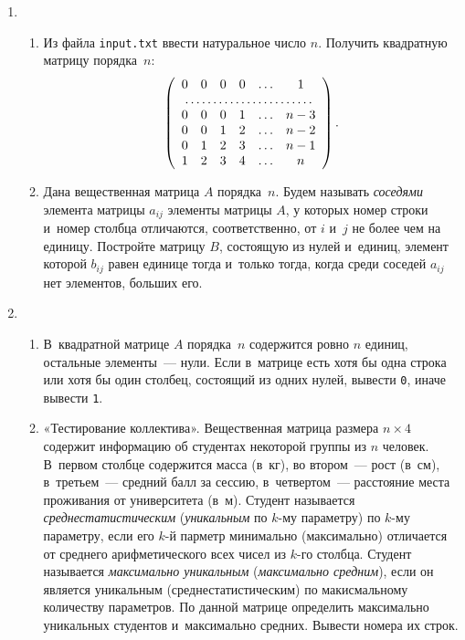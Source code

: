 \documentclass{article}
\newcommand{\textex}[1]{\texttt{\color{ForestGreen}#1}}
\begin{document}
\begin{enumerate}[label={}, leftmargin=0pt, itemindent=0pt]
\item
\begin{enumerate}[label=\arabic{enumi}.\arabic*.] %
  \item
  Из файла \texttt{input.txt} ввести натуральное число $n$. Получить квадратную матрицу порядка~$n$:
  \[
  \left(\begin{array}{cccccc}
  0 & 0 & 0 & 0 & \ldots & 1\\
  \multicolumn{6}{c}{\dotfill}\\
  0 & 0 & 0 & 1 & \ldots & n-3\\
  0 & 0 & 1 & 2 & \ldots & n-2\\
  0 & 1 & 2 & 3 & \ldots & n-1\\
  1 & 2 & 3 & 4 & \ldots & n
  \end{array}
  \right).
  \]
  \item
  Дана вещественная матрица $A$ порядка~$n$. Будем называть \emph{соседями} элемента матрицы $a_{ij}$ элементы матрицы $A$, у которых номер строки и~номер столбца отличаются, соответственно, от $i$ и~$j$ не более чем на единицу. Постройте матрицу $B$, состоящую из нулей и~единиц, элемент которой $b_{ij}$ равен единице тогда и~только тогда, когда среди соседей $a_{ij}$ нет элементов, больших его.
\end{enumerate}

\item
\begin{enumerate}[label=\arabic{enumi}.\arabic*.] %
\item
  В~квадратной матрице $A$ порядка~$n$ содержится ровно $n$ единиц, остальные элементы~— нули. Если в~матрице есть хотя бы одна строка или хотя бы один  столбец, состоящий из одних нулей, вывести \textex{0}, иначе вывести \textex{1}.
  \item
  «Тестирование коллектива». Вещественная матрица размера $n × 4$ содержит информацию об студентах некоторой группы из $n$ человек. В~первом столбце содержится масса (в~кг), во втором~— рост (в~см), в~третьем~— средний балл за сессию, в~четвертом~— расстояние места проживания от университета (в~м). Студент называется \emph{среднестатистическим} (\emph{уникальным} по $k$-му параметру) по $k$-му параметру, если его $k$-й парметр минимально (максимально) отличается от среднего арифметического всех чисел из $k$-го столбца. Студент называется \emph{максимально уникальным} (\emph{максимально средним}), если он является уникальным (среднестатистическим) по макисмальному количеству параметров. По данной матрице определить максимально уникальных студентов и~максимально средних. Вывести номера их строк.
\end{enumerate}


\end{enumerate}
\end{document}
